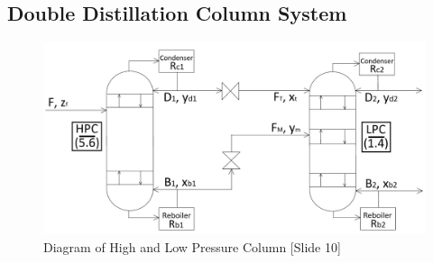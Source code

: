 \documentclass[11pt, oneside]{article}
\begin{document}
    \subsection{Double Distillation Column System}
    \begin{figure}[ht]
        \centering
        \includegraphics[width=0.9\linewidth]{airseparation/handouts/graphics/labelled_columns_diagram_simple.jpg}
        \caption{Diagram of High and Low Pressure Column [Slide 10]}
        \label{fig:column_linkage}
    \end{figure}
    \hfill
    \hfill
\end{document}
